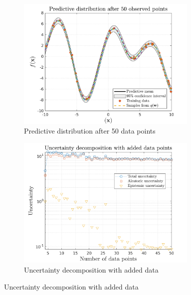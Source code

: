 \begin{figure}[H]
  \vspace{4ex}  %
  \begin{subfigure}[b]{0.48\linewidth}
    \centering
    \includegraphics[height=0.18\textheight,width=0.95\textwidth]{Chapter3/Figures/func_uncertainty_3.png} 
    \caption{Predictive distribution after 50 data points} 
    \label{Fig:Re-pred-50-points}
  \end{subfigure} 
  \hspace{\fill}
  \begin{subfigure}[b]{0.48\linewidth}
    \centering
    \includegraphics[height=0.18\textheight,width=0.95\textwidth]{Chapter3/Figures/func_uncertainty_4.png} 
    \caption{Uncertainty decomposition with added data} 
    \label{Fig:Re-function-uncertainty} 
  \end{subfigure} 


\end{figure}
